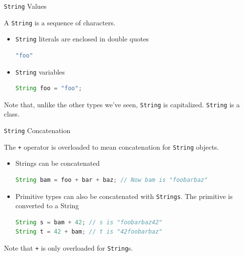 \documentclass{beamer}
\begin{document}
\begin{frame}[fragile]{{\tt String} Values}


A {\tt String} is a sequence of characters.
\begin{itemize}

\item {\tt String} literals are enclosed in double quotes
\begin{lstlisting}[language=Java]
"foo"
\end{lstlisting}

\item {\tt String} variables

\begin{lstlisting}[language=Java]
String foo = "foo";
\end{lstlisting}

\end{itemize}

Note that, unlike the other types we've seen, {\tt String} is capitalized.  {\tt String} is a class.

\end{frame}


\begin{frame}[fragile]{{\tt String} Concatenation }


The {\tt +} operator is overloaded to mean concatenation for {\tt String} objects.

\begin{itemize}

\item Strings can be concatenated
\begin{lstlisting}[language=Java]
String bam = foo + bar + baz; // Now bam is "foobarbaz"
\end{lstlisting}

\item Primitive types can also be concatenated with {\tt Strings}.  The primitive is converted to a String
\begin{lstlisting}[language=Java]
String s = bam + 42; // s is "foobarbaz42"
String t = 42 + bam; // t is "42foobarbaz"
\end{lstlisting}

\end{itemize}

Note that {\tt +} is only overloaded for {\tt String}s.

\end{frame}
\end{document}
